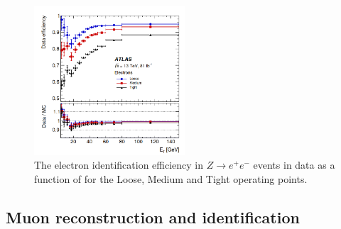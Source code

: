 \begin{figure}[htbp]
    \centering
    \includegraphics[width=0.5\textwidth]{Ch2/Img/Electron_ID_Eff.png}
    \caption{The electron identification efficiency in $Z\rightarrow e^+e^-$ events in data as a function of \eT for the Loose, Medium and Tight operating points.}
    \label{fig:chap2:Objects:Egamma:EID:Eff}
\end{figure}

\subsection{Muon reconstruction and identification}
\label{chap2:Objects:Muon}
